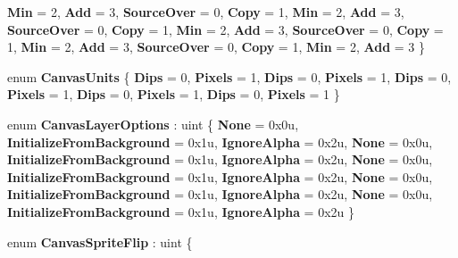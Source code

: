 \begin{DoxyCompactItemize}
{\bfseries Min} = 2, 
{\bfseries Add} = 3, 
\newline
{\bfseries Source\+Over} = 0, 
{\bfseries Copy} = 1, 
{\bfseries Min} = 2, 
{\bfseries Add} = 3, 
\newline
{\bfseries Source\+Over} = 0, 
{\bfseries Copy} = 1, 
{\bfseries Min} = 2, 
{\bfseries Add} = 3, 
\newline
{\bfseries Source\+Over} = 0, 
{\bfseries Copy} = 1, 
{\bfseries Min} = 2, 
{\bfseries Add} = 3, 
\newline
{\bfseries Source\+Over} = 0, 
{\bfseries Copy} = 1, 
{\bfseries Min} = 2, 
{\bfseries Add} = 3
 \}
\item 
\mbox{\label{namespace_microsoft_1_1_graphics_1_1_canvas_a42a64ab003f060d5bc514b2c0c2f9869}} 
enum {\bfseries Canvas\+Units} \{ \newline
{\bfseries Dips} = 0, 
{\bfseries Pixels} = 1, 
{\bfseries Dips} = 0, 
{\bfseries Pixels} = 1, 
\newline
{\bfseries Dips} = 0, 
{\bfseries Pixels} = 1, 
{\bfseries Dips} = 0, 
{\bfseries Pixels} = 1, 
\newline
{\bfseries Dips} = 0, 
{\bfseries Pixels} = 1
 \}
\item 
\mbox{\label{namespace_microsoft_1_1_graphics_1_1_canvas_a111054cba4b53759d62af260e252fe48}} 
enum {\bfseries Canvas\+Layer\+Options} \+: uint \{ \newline
{\bfseries None} = 0x0u, 
{\bfseries Initialize\+From\+Background} = 0x1u, 
{\bfseries Ignore\+Alpha} = 0x2u, 
{\bfseries None} = 0x0u, 
\newline
{\bfseries Initialize\+From\+Background} = 0x1u, 
{\bfseries Ignore\+Alpha} = 0x2u, 
{\bfseries None} = 0x0u, 
{\bfseries Initialize\+From\+Background} = 0x1u, 
\newline
{\bfseries Ignore\+Alpha} = 0x2u, 
{\bfseries None} = 0x0u, 
{\bfseries Initialize\+From\+Background} = 0x1u, 
{\bfseries Ignore\+Alpha} = 0x2u, 
\newline
{\bfseries None} = 0x0u, 
{\bfseries Initialize\+From\+Background} = 0x1u, 
{\bfseries Ignore\+Alpha} = 0x2u
 \}
\item 
\mbox{\label{namespace_microsoft_1_1_graphics_1_1_canvas_ab01b519fa39176572bedd129db922814}} 
enum {\bfseries Canvas\+Sprite\+Flip} \+: uint \{ \newline

\end{DoxyCompactItemize}

